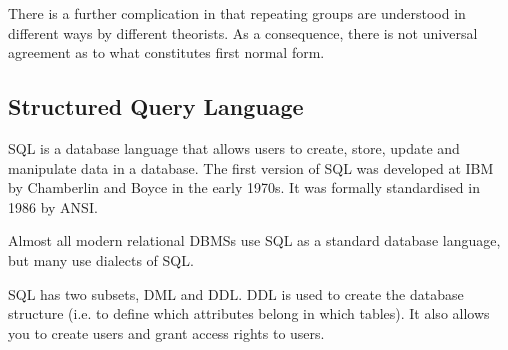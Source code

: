 \documentclass{article}
\begin{document}
There is a further complication in that repeating groups are understood in
different ways by different theorists. As a consequence, there is not universal
agreement as to what constitutes first normal form.

\subsection{Structured Query Language}

SQL is a database language that allows users to create, store, update and
manipulate data in a database. The first version of SQL was developed at IBM by
Chamberlin and Boyce in the early 1970s. It was formally standardised in 1986 by
ANSI.

Almost all modern relational DBMSs use SQL as a standard database language, but
many use dialects of SQL.

SQL has two subsets, DML and DDL. DDL is used to create the
database structure (i.e. to define which attributes belong in which tables). It
also allows you to create users and grant access rights to users.
\end{document}
